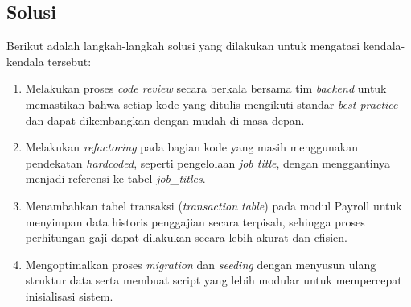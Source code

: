 \subsection{Solusi}
Berikut adalah langkah-langkah solusi yang dilakukan untuk mengatasi kendala-kendala tersebut:
\begin{enumerate}
    \item Melakukan proses \textit{code review} secara berkala bersama tim \textit{backend} untuk memastikan bahwa setiap kode yang ditulis mengikuti standar \textit{best practice} dan dapat dikembangkan dengan mudah di masa depan.
    \item Melakukan \textit{refactoring} pada bagian kode yang masih menggunakan pendekatan \textit{hardcoded}, seperti pengelolaan \textit{job title}, dengan menggantinya menjadi referensi ke tabel \textit{job\_titles}.
    \item Menambahkan tabel transaksi (\textit{transaction table}) pada modul Payroll untuk menyimpan data historis penggajian secara terpisah, sehingga proses perhitungan gaji dapat dilakukan secara lebih akurat dan efisien.
    \item Mengoptimalkan proses \textit{migration} dan \textit{seeding} dengan menyusun ulang struktur data serta membuat script yang lebih modular untuk mempercepat inisialisasi sistem.
\end{enumerate}





